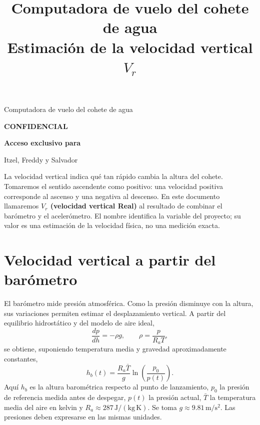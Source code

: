 \documentclass[11pt,a4paper]{article}
\title{Computadora de vuelo del cohete de agua\\\large Estimación de la velocidad vertical $V_r$}
\author{}
\date{}
\begin{document}
\hypersetup{pageanchor=false}
\begin{titlepage}
\vspace*{3cm}
\begin{center}
{\Large Computadora de vuelo del cohete de agua\par}
\vspace{2cm}
{\color{red}\Huge\bfseries CONFIDENCIAL\par}
\vspace{0.3em}
{\color{red}\Large\bfseries Acceso exclusivo para\par
Itzel, Freddy y Salvador\par}
\end{center}
\vfill
\end{titlepage}
\hypersetup{pageanchor=true}

\maketitle
\vspace{-1.5em}
La velocidad vertical indica qué tan rápido cambia la altura del cohete. Tomaremos el sentido ascendente como positivo: una velocidad positiva corresponde al ascenso y una negativa al descenso. En este documento llamaremos \textbf{$V_r$ (velocidad vertical Real)} al resultado de combinar el barómetro y el acelerómetro. El nombre identifica la variable del proyecto; su valor es una estimación de la velocidad física, no una medición exacta.

\section{Velocidad vertical a partir del barómetro}
El barómetro mide presión atmosférica. Como la presión disminuye con la altura, sus variaciones permiten estimar el desplazamiento vertical. A partir del equilibrio hidrostático y del modelo de aire ideal,
\begin{equation}
 \frac{dp}{dh}=-\rho g,\qquad \rho=\frac{p}{R_a T},
\end{equation}
se obtiene, suponiendo temperatura media y gravedad aproximadamente constantes,
\begin{equation}
 h_b(t)=\frac{R_a\bar T}{g}\ln\left(\frac{p_0}{p(t)}\right).
\end{equation}
Aquí $h_b$ es la altura barométrica respecto al punto de lanzamiento, $p_0$ la presión de referencia medida antes de despegar, $p(t)$ la presión actual, $\bar T$ la temperatura media del aire en kelvin y $R_a\approx287\,\mathrm{J/(kg\,K)}$. Se toma $g\approx9.81\,\mathrm{m/s^2}$. Las presiones deben expresarse en las mismas unidades.
\end{document}
